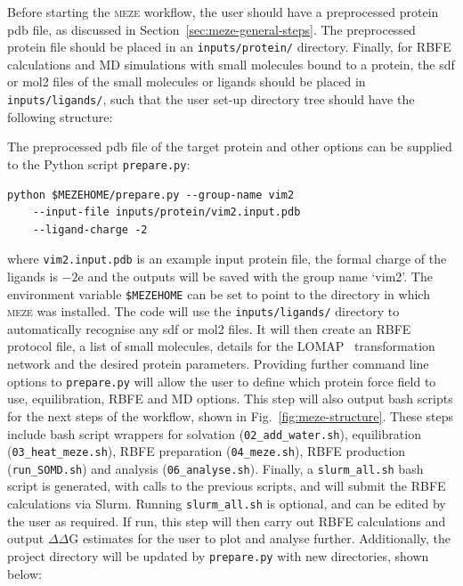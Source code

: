 Before starting the \textsc{meze} workflow, the user should have a preprocessed protein pdb file, as discussed in Section~\ref{sec:meze-general-steps}. 
The preprocessed protein file should be placed in an \texttt{inputs/protein/} directory. Finally, for RBFE calculations and MD simulations with small molecules bound to a protein, the sdf or mol2 files of the small molecules or ligands should be placed in \texttt{inputs/ligands/}, such that the user set-up directory tree should have the following structure:

\begin{tcolorbox}
[title=User set-up directory tree:, colframe=myframecolour]
\end{tcolorbox}

The preprocessed pdb file of the target protein and other options can be supplied to the Python script \texttt{prepare.py}:

\begin{tcolorbox}[title=Preparing meze:,breakable, colframe=myframecolour]
\begin{verbatim}
python $MEZEHOME/prepare.py --group-name vim2 
    --input-file inputs/protein/vim2.input.pdb 
    --ligand-charge -2 
\end{verbatim}
\end{tcolorbox}
\noindent where \texttt{vim2.input.pdb} is an example input protein file, the formal charge of the ligands is $-2$e and the outputs will be saved with the group name `vim2'. The environment variable \texttt{\$MEZEHOME} can be set to point to the directory in which \textsc{meze} was installed. The code will use the \texttt{inputs/ligands/} directory to automatically recognise any sdf or mol2 files. It will then create an RBFE protocol file, a list of small molecules, details for the LOMAP~\cite{liu_lead_2013} transformation network and the desired protein parameters. Providing further command line options to \texttt{prepare.py} will allow the user to define which protein force field to use, equilibration, RBFE and MD options. This step will also output bash scripts for the next steps of the workflow, shown in Fig.~\ref{fig:meze-structure}. These steps include bash script wrappers for solvation (\texttt{02\_add\_water.sh}), equilibration (\texttt{03\_heat\_meze.sh}), RBFE preparation (\texttt{04\_meze.sh}), RBFE production (\texttt{run\_SOMD.sh}) and analysis (\texttt{06\_analyse.sh}). Finally, a \texttt{slurm\_all.sh} bash script is generated, with calls to the previous scripts, and will submit the RBFE calculations via Slurm. Running \texttt{slurm\_all.sh} is optional, and can be edited by the user as required. If run, this step will then carry out RBFE calculations and output $\Delta\Delta$G estimates for the user to plot and analyse further. Additionally, the project directory will be updated by \texttt{prepare.py} with new directories, shown below:


